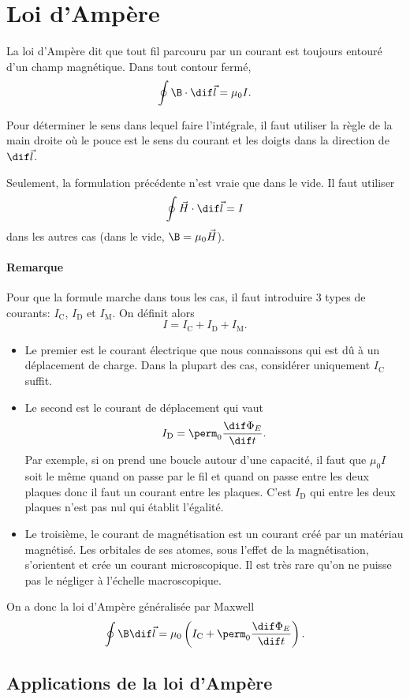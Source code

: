 \section{Loi d'Ampère}
La loi d'Ampère dit que tout fil parcouru par un courant
est toujours entouré d'un champ magnétique.
Dans tout contour fermé,
\[ \oint \B \cdot \dif \vec l = \mu_0 I. \]

Pour déterminer le sens dans lequel faire l'intégrale,
il faut utiliser la règle de la main droite
où le pouce est le sens du courant
et les doigts dans la direction de $\dif\vec l$.

Seulement, la formulation précédente n'est vraie que dans le vide.
Il faut utiliser
\[ \oint \vec H \cdot \dif \vec l = I \]
dans les autres cas (dans le vide, $\B = \mu_0 \vec H$).

\paragraph{Remarque}
Pour que la formule marche dans tous les cas,
il faut introduire 3 types de courants:
$I_\mathrm{C}$, $I_\mathrm{D}$ et $I_\mathrm{M}$.
On définit alors
\[ I = I_\mathrm{C} + I_\mathrm{D} + I_\mathrm{M}. \]

\begin{itemize}
  \item Le premier est le courant électrique
    que nous connaissons qui est dû à un déplacement de charge.
    Dans la plupart des cas, considérer uniquement $I_\mathrm{C}$ suffit.
  \item Le second est le courant de déplacement qui vaut
    \[ I_\mathrm{D} = \perm_0\frac{\dif \Phi_E}{\dif t}. \]
    Par exemple, si on prend une boucle autour d'une capacité,
    il faut que $\mu_0I$ soit le même quand on passe par le fil et quand
    on passe entre les deux plaques donc il faut un courant entre les plaques.
    C'est $I_\mathrm{D}$ qui entre les deux plaques
    n'est pas nul qui établit l'égalité.
  \item Le troisième,
    le courant de magnétisation est un courant créé par un matériau magnétisé.
    Les orbitales de ses atomes, sous l'effet de la magnétisation,
    s'orientent et crée un courant microscopique.
    Il est très rare qu'on ne puisse pas le négliger à l'échelle macroscopique.
\end{itemize}
On a donc la loi d'Ampère généralisée par Maxwell
\[ \oint \B \dif \vec l =
\mu_0 \left(I_\mathrm{C} + \perm_0 \frac{\dif \Phi_E}{\dif t}\right). \]

\subsection{Applications de la loi d'Ampère}
